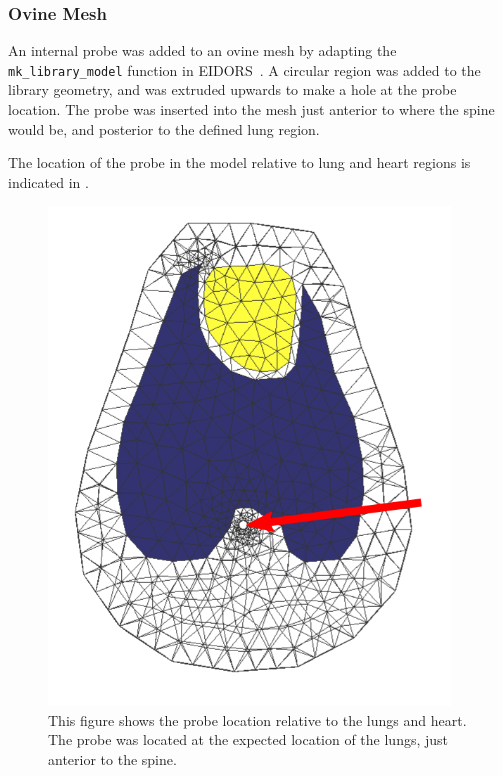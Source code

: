 \subsubsection{Ovine Mesh}
An internal probe was added to an ovine mesh by adapting the 
\verb!mk_library_model!
function in EIDORS~\parencite{adler_eidors_2017}. A circular region was added to the
library geometry, and was extruded upwards to make a hole at the probe location. 
The probe was inserted into the mesh just anterior to where the spine would be,
and posterior to the defined lung region. 

The location of the probe in the model relative to lung and heart 
regions is indicated in . 
\begin{figure}[H]
    \centering
	\includegraphics[width=0.95\textwidth]{chapter7-internal_elec_motion/imgs/internal_probe_location.png} 
	\caption[Ovine mesh with organ regions and probe placement]{\label{fig:ovine_anatomy} 
	This figure shows the probe location relative to the lungs and heart. The probe was located 
	at the expected location of the lungs, just anterior to the spine. }
\end{figure}

